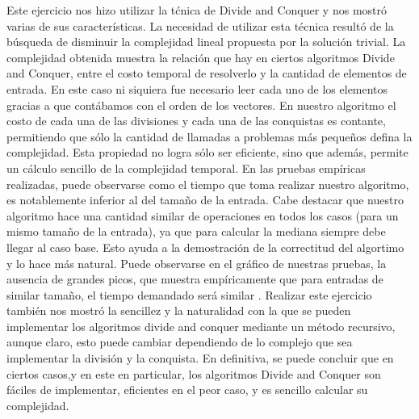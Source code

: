 \documentclass[a4paper,10pt] {article}
\begin{document}
Este ejercicio nos hizo utilizar la t\'cnica de Divide and Conquer y nos mostr\'o varias de sus caracter\'isticas. La necesidad de utilizar 
esta t\'ecnica result\'o de la b\'usqueda de disminuir la complejidad lineal propuesta por la solución trivial.
	La complejidad obtenida muestra la relaci\'on que hay en ciertos algoritmos Divide and Conquer, entre el costo temporal de resolverlo 
y la cantidad de elementos de entrada. En este caso ni siquiera fue necesario leer cada uno de los elementos gracias a que cont\'abamos con
el orden de los vectores.
	En nuestro algoritmo el costo de cada una de las divisiones y cada una de las conquistas es contante, permitiendo que s\'olo 
la cantidad de llamadas a problemas m\'as peque\~{n}os defina la complejidad. Esta propiedad no logra s\'olo ser eficiente, sino que adem\'as, 
permite un c\'alculo sencillo de la complejidad temporal. En las pruebas emp\'iricas realizadas, puede observarse como el tiempo que toma realizar nuestro algoritmo,
es notablemente inferior al del tama\~{n}o de la entrada. Cabe destacar que nuestro algoritmo hace una cantidad similar de operaciones en todos los casos (para un mismo
tama\~{n}o de la entrada), ya que para calcular la mediana siempre debe llegar al caso base. Esto ayuda a la demostraci\'on de la correctitud del algortimo y lo hace 
m\'as natural. Puede observarse en el gr\'afico de nuestras pruebas, la ausencia de grandes picos, que muestra emp\'iricamente que para entradas de similar tama\~{n}o, el 
tiempo demandado ser\'a similar .
	Realizar este ejercicio tambi\'en nos mostr\'o la sencillez y la naturalidad con la que se pueden implementar los algoritmos divide and conquer mediante un 
m\'etodo recursivo, aunque claro, esto puede cambiar dependiendo de lo complejo que sea implementar la divisi\'on y la conquista. 
	En definitiva, se puede concluir que en ciertos casos,y en este en particular, los algoritmos Divide and Conquer son f\'aciles de implementar, eficientes en el peor caso, y es 
sencillo calcular su complejidad.
\end{document}
